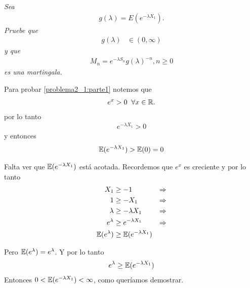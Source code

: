 \emph{
	Sea
	\begin{align}
		g(\lambda)=E(e^{- \lambda X_1}).
	\end{align} 
	Pruebe que 
	\begin{align}
		g(\lambda)	&\in (0,\infty)\label{problema2_1:parte1}
	\end{align}		
	y que
	\begin{align}
		M_n=e^{-\lambda S_n}g(\lambda)^{-n},n\geq 0
	\end{align}
	es una martingala.\\
}
	
	Para probar \eqref{problema2_1:parte1} notemos que
	\begin{align}
		e^x > 0 \;\; \forall x \in \mathbb{R}.
	\end{align}
	por lo tanto
	\begin{align}
		e^{-\lambda X_1} > 0
	\end{align}
	y entonces
	\begin{align}
		\mathbb{E}(e^{-\lambda X_1}) >\mathbb{E}(0) = 0
	\end{align}

	Falta ver que $\mathbb{E}(e^{-\lambda X_1})$ está acotada. Recordemos que $e^x$ es creciente y por lo tanto
	\begin{align}
			X_1 			&\geq 	-1 						& \Rightarrow\\
			1 				&\geq 	- X_1					& \Rightarrow\\
			\lambda			&\geq 	- \lambda X_1			& \Rightarrow\\
			e^{\lambda}		&\geq 	e^{- \lambda X_1}		& \Rightarrow\\
			\mathbb{E}(e^{\lambda})	&\geq 	\mathbb{E}(e^{- \lambda X_1})
	\end{align}
	
	Pero $\mathbb{E}(e^{\lambda}) = e^{\lambda}$. Y por lo tanto
	\begin{align}
		e^{\lambda} \geq 	\mathbb{E}(e^{- \lambda X_1})
	\end{align}	
	Entonces $0 < \mathbb{E}(e^{-\lambda X_1}) < \infty$, como queríamos demostrar.